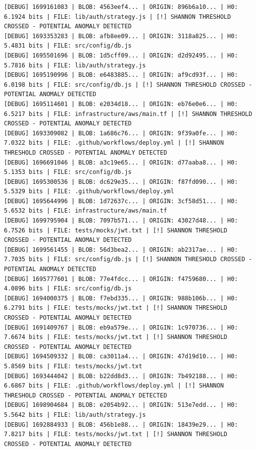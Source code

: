 \documentclass[12pt, a4paper, oneside]{report}
\begin{document}
\begin{lstlisting}[basicstyle=\tiny\ttfamily]
[DEBUG] 1699161083 | BLOB: 4563eef4... | ORIGIN: 896b6a10... | H0: 6.1924 bits | FILE: lib/auth/strategy.js | [!] SHANNON THRESHOLD CROSSED - POTENTIAL ANOMALY DETECTED
[DEBUG] 1693353283 | BLOB: afb8ee09... | ORIGIN: 3118a825... | H0: 5.4831 bits | FILE: src/config/db.js
[DEBUG] 1695501696 | BLOB: 1d5cff09... | ORIGIN: d2d92495... | H0: 5.7816 bits | FILE: lib/auth/strategy.js
[DEBUG] 1695190996 | BLOB: e6483885... | ORIGIN: af9cd93f... | H0: 6.0198 bits | FILE: src/config/db.js | [!] SHANNON THRESHOLD CROSSED - POTENTIAL ANOMALY DETECTED
[DEBUG] 1695114601 | BLOB: e2034d18... | ORIGIN: eb76e0e6... | H0: 6.5217 bits | FILE: infrastructure/aws/main.tf | [!] SHANNON THRESHOLD CROSSED - POTENTIAL ANOMALY DETECTED
[DEBUG] 1693309082 | BLOB: 1a686c76... | ORIGIN: 9f39a0fe... | H0: 7.0322 bits | FILE: .github/workflows/deploy.yml | [!] SHANNON THRESHOLD CROSSED - POTENTIAL ANOMALY DETECTED
[DEBUG] 1696691046 | BLOB: a3c19e65... | ORIGIN: d77aaba8... | H0: 5.1353 bits | FILE: src/config/db.js
[DEBUG] 1695300536 | BLOB: dc629e35... | ORIGIN: f87fd090... | H0: 5.5329 bits | FILE: .github/workflows/deploy.yml
[DEBUG] 1695644996 | BLOB: 1d72637c... | ORIGIN: 3cf58d51... | H0: 5.6532 bits | FILE: infrastructure/aws/main.tf
[DEBUG] 1699795904 | BLOB: 7097b571... | ORIGIN: 43027d48... | H0: 6.7526 bits | FILE: tests/mocks/jwt.txt | [!] SHANNON THRESHOLD CROSSED - POTENTIAL ANOMALY DETECTED
[DEBUG] 1699561455 | BLOB: 56d3bea2... | ORIGIN: ab2317ae... | H0: 7.7035 bits | FILE: src/config/db.js | [!] SHANNON THRESHOLD CROSSED - POTENTIAL ANOMALY DETECTED
[DEBUG] 1695777601 | BLOB: 77e4fdcc... | ORIGIN: f4759680... | H0: 4.0896 bits | FILE: src/config/db.js
[DEBUG] 1694000375 | BLOB: f7ebd335... | ORIGIN: 988b106b... | H0: 6.2791 bits | FILE: tests/mocks/jwt.txt | [!] SHANNON THRESHOLD CROSSED - POTENTIAL ANOMALY DETECTED
[DEBUG] 1691409767 | BLOB: eb9a579e... | ORIGIN: 1c970736... | H0: 7.6674 bits | FILE: tests/mocks/jwt.txt | [!] SHANNON THRESHOLD CROSSED - POTENTIAL ANOMALY DETECTED
[DEBUG] 1694509332 | BLOB: ca3011a4... | ORIGIN: 47d19d10... | H0: 5.8569 bits | FILE: tests/mocks/jwt.txt
[DEBUG] 1693444042 | BLOB: b22dd8d3... | ORIGIN: 7b492188... | H0: 6.6867 bits | FILE: .github/workflows/deploy.yml | [!] SHANNON THRESHOLD CROSSED - POTENTIAL ANOMALY DETECTED
[DEBUG] 1698904684 | BLOB: e2054b92... | ORIGIN: 513e7edd... | H0: 5.5642 bits | FILE: lib/auth/strategy.js
[DEBUG] 1692884933 | BLOB: 456b1e88... | ORIGIN: 18439e29... | H0: 7.8217 bits | FILE: tests/mocks/jwt.txt | [!] SHANNON THRESHOLD CROSSED - POTENTIAL ANOMALY DETECTED

\end{lstlisting}
\end{document}
